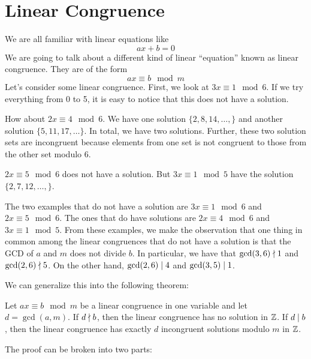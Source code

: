 

\usepackage{xr}


\newcommand\lcm{\mathrm{lcm}}



\section{Linear Congruence}

We are all familiar with linear equations like
$$
ax + b = 0
$$
We are going to talk about a different kind of linear ``equation'' known as linear congruence. They are of the form
$$
ax \equiv b \mod m
$$
Let's consider some linear congruence. First, we look at $3x \equiv 1 \mod 6$. If we try everything from 0 to 5, it is easy to notice that this does not have a solution.

How about $2x \equiv 4 \mod 6$. We have one solution $\{2,8,14,\ldots,\}$ and another solution $\{5,11,17,\ldots\}$. In total, we have two solutions. Further, these two solution sets are incongruent because elements from one set is not congruent to those from the other set modulo $6$.

$2x \equiv 5 \mod 6$ does not have a solution. But $3x \equiv 1 \mod 5$ have the solution $\{2,7,12,\ldots,\}$.

The two examples that do not have a solution are $3x \equiv 1 \mod 6$ and $2x \equiv 5 \mod 6$. The ones that do have solutions are $2x \equiv 4 \mod 6$ and $3x \equiv 1 \mod 5$. From these examples, we make the observation that one thing in common among the linear congruences that do not have a solution is that the GCD of $a$ and $m$ does not divide $b$. In particular, we have that $\gcd(3,6) \mathrel{\nmid} 1$ and $\gcd(2,6) \mathrel{\nmid} 5$. On the other hand, $\gcd(2,6) \mathrel{\mid} 4$ and $\gcd(3,5) \mathrel{\mid} 1$.

We can generalize this into the following theorem:

\begin{theorem}
    Let $ax \equiv b \mod m$ be a linear congruence in one variable and let $d = \gcd(a,m)$. If $d \mathrel{\nmid} b$, then the linear congruence has no solution in $\mathbb{Z}$. If $d \mathrel{\mid} b$, then the linear congruence has exactly $d$ incongruent solutions modulo $m$ in $\mathbb{Z}$.
\end{theorem}

The proof can be broken into two parts: 

